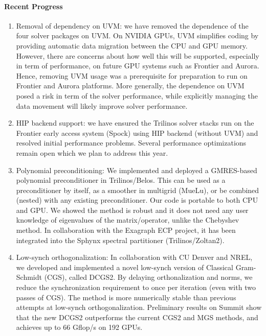 \paragraph{Recent Progress}
\begin{enumerate}
\item Removal of dependency on UVM:
we have removed the dependence of the four solver packages on UVM.
On NVIDIA GPUs, UVM simplifies coding by providing automatic data migration between the CPU and GPU memory. However, there are concerns about how well this will be supported, especially in term of performance, on future GPU systems such as Frontier and Aurora. Hence, removing UVM usage was a prerequisite for preparation to run on Frontier and Aurora platforms. 
More generally, the dependence on UVM posed a risk in term of the solver performance, while explicitly managing the data movement will likely improve solver performance. 

\item HIP backend support:
we have ensured the Trilinos solver stacks run on the Frontier early access system (Spock) using HIP backend (without UVM) and resolved initial performance problems. Several performance optimizations remain open which we plan to address this year.

\item Polynomial preconditioning: We implemented and deployed a GMRES-based polynomial preconditioner in Trilinos/Belos. This can be used as a preconditioner by itself, as a smoother in multigrid (MueLu), or be combined (nested) with any existing preconditioner. Our code is portable to both CPU and GPU. We showed the method is robust and it does not need any user knowledge of eigenvalues of the matrix/operator, unlike the Chebyshev method. In collaboration with the Exagraph ECP project, it has been integrated into the Sphynx spectral partitioner (Trilinos/Zoltan2).

\item Low-synch orthogonalization: In collaboration with CU Denver and NREL, we developed and implemented a novel low-synch version of Classical Gram-Schmidt (CGS), called DCGS2. By delaying orthonalization and norms, we reduce the synchronization requirement to once per iteration (even with two passes of CGS). The method is more numerically stable than previous attempts at low-synch orthogonalization. Preliminary results on Summit show that the new DCGS2 outperforms the current CGS2 and MGS methods, and achieves up to 66 Gflop/s on 192 GPUs.
\end{enumerate}

